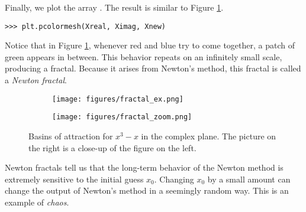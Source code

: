 Finally, we plot the array . The result is similar to Figure \ref{fig:fractal_ex}.

\begin{lstlisting}
>>> plt.pcolormesh(Xreal, Ximag, Xnew)
\end{lstlisting}

Notice that in Figure \ref{fig:fractal_ex}, whenever red and blue try to come together, a patch of green appears in between.
This behavior repeats on an infinitely small scale, producing a fractal.
Because it arises from Newton's method, this fractal is called a \emph{Newton fractal}.

\begin{figure}
\begin{center}
\begin{subfigure}[b]{.49\textwidth}
\centering
\texttt{[image: figures/fractal\_ex.png]}
\end{subfigure}
\begin{subfigure}[b]{.49\textwidth}
\centering
\texttt{[image: figures/fractal\_zoom.png]}
\end{subfigure}
\caption{ Basins of attraction for $x^3-x$ in the complex plane.
The picture on the right is a close-up of the figure on the left.}
\label{fig:fractal_ex}
\end{center}
\end{figure}

Newton fractals tell us that the long-term behavior of the Newton method is extremely sensitive to the initial guess $x_0$.
Changing $x_0$ by a small amount can change the output of Newton's method in a seemingly random way.
This is an example of \emph{chaos}.


